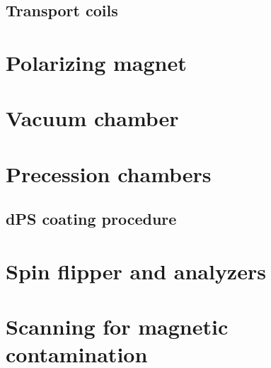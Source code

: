 
\subsection{Transport coils}



\section{Polarizing magnet}\label{sec:PM_description}



\section{Vacuum chamber}



\section{Precession chambers}



\subsection{dPS coating procedure}





\section{Spin flipper and analyzers}\label{sec:spin_flipper_analyzer}



\section{Scanning for magnetic contamination}

